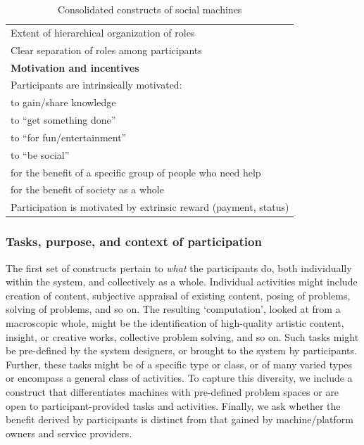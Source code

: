 \documentclass{sig-alternate}
\begin{document}
\begin{table}[htb]
\begin{center}
\begin{scriptsize}
\begin{tabular}{|p{8cm}|}
Extent of hierarchical organization of roles \\
Clear separation of roles among participants \\
{\bf Motivation and incentives} \\
\hline
Participants are intrinsically motivated:\\
\hspace{1cm} to gain/share knowledge \\
\hspace{1cm} to ``get something done'' \\
\hspace{1cm} to ``for fun/entertainment''\\
\hspace{1cm} to ``be social'' \\
\hspace{1cm} for the benefit of a specific group of people who need help \\
\hspace{1cm} for the benefit of society as a whole \\
Participation is motivated by extrinsic reward (payment, status) \\
\hline

\end{tabular}
\end{scriptsize}
\end{center}
\caption{Consolidated constructs of social machines} \label{table:constructs}
\end{table}

\subsubsection{Tasks, purpose, and context of participation}
The first set of constructs pertain to \emph{what} the participants
do, both individually within the system, and collectively as a whole.
Individual activities might include creation of content, subjective
appraisal of existing content, posing of problems, solving of
problems, and so on. The resulting `computation', looked at from a
macroscopic whole, might be the identification of high-quality
artistic content, insight, or creative works, collective problem
solving, and so on. Such tasks might be pre-defined by the system
designers, or brought to the system by participants. Further, these
tasks might be of a specific type or class, or of many varied types or
encompass a general class of activities. To capture this diversity,
we include a construct that differentiates machines with pre-defined problem spaces or are open to participant-provided tasks and activities. Finally, we ask whether the benefit derived by
participants is distinct from that gained by machine/platform owners
and service providers.
\end{document}
